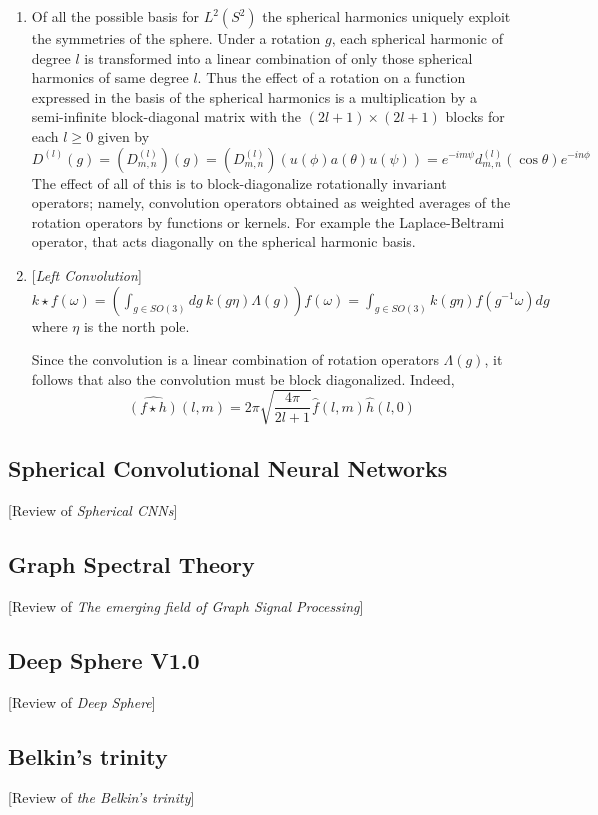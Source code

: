 \begin{enumerate}
	\item Of all the possible basis for $L^2(S^2)$ the spherical harmonics uniquely exploit the symmetries of the sphere. Under a rotation $g$, each spherical harmonic of degree $l$ is transformed into a linear combination of only those spherical harmonics of same degree $l$.
	Thus the effect of a rotation on a function expressed in the basis of the spherical harmonics is a multiplication by a semi-infinite block-diagonal matrix with the $(2l+1)\times(2l+1)$ blocks for each $l \geq 0$ given by $$D^{(l)}(g) = \left(D^{(l)}_{m,n}\right) (g) =  \left(D^{(l)}_{m,n}\right)(u(\phi)a(\theta)u(\psi)) = e^{-im\psi}d^{(l)}_{m,n}(\cos \theta) e^{-in\phi}$$
	The effect of all of this is to block-diagonalize rotationally invariant operators; namely, convolution operators obtained as weighted averages of the rotation operators by functions or kernels. For example the Laplace-Beltrami operator, that acts diagonally on the spherical harmonic basis.
	\item \begin{definition}{[\textit{Left Convolution}]}\\
		$k\star f(\omega) = \left(\int_{g\in SO(3)}dg\ k(g\eta)\Lambda(g)\right)f(\omega) = \int_{g\in SO(3)}k(g\eta)f(g^{-1}\omega)dg$
		where $\eta$ is the north pole. 
	\end{definition}
	Since the convolution is a linear combination of rotation operators $\Lambda(g)$, it follows that also the convolution must be block diagonalized. Indeed,
	$$\hat {(f \star h)}(l,m) = 2\pi \sqrt{\frac{4\pi}{2l+1}}\hat f(l,m) \hat h(l,0) $$

\end{enumerate}

\subsection{Spherical Convolutional Neural Networks}
[Review of \textit{Spherical CNNs}]
\subsection{Graph Spectral Theory}
[Review of \textit{The emerging field of Graph Signal Processing}]
\subsection{Deep Sphere V1.0}
[Review of \textit{Deep Sphere}]
\subsection{Belkin's trinity}
[Review of \textit{the Belkin's trinity}]

